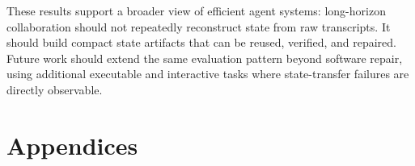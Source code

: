 \documentclass{article} %
\begin{document}
These results support a broader view of efficient agent systems: long-horizon collaboration should not repeatedly reconstruct state from raw transcripts. It should build compact state artifacts that can be reused, verified, and repaired. Future work should extend the same evaluation pattern beyond software repair, using additional executable and interactive tasks where state-transfer failures are directly observable.





\appendix
\clearpage
\section*{Appendices}
% 
\end{document}
